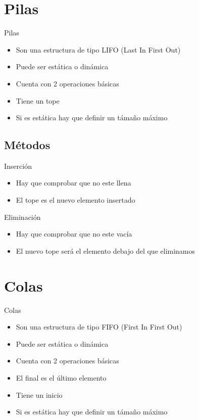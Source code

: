 \documentclass{beamer}
\begin{document}
\section{Pilas}
\begin{frame}{Pilas}
	\begin{itemize}
		\item Son una estructura de tipo LIFO (Last In First Out)
		\item Puede ser est\'atica o din\'amica
		\item Cuenta con 2 operaciones b\'asicas
		\item Tiene un tope
		\item Si es est\'atica hay que definir un t\'amaño m\'aximo
	\end{itemize}
\end{frame}

\subsection{M\'etodos}

\begin{frame}{Inserci\'on}
	\begin{itemize}
		\item Hay que comprobar que no este llena
		\item El tope es el nuevo elemento insertado
	\end{itemize}
	\centering
\end{frame}

\begin{frame}{Eliminaci\'on}
	\begin{itemize}
		\item Hay que comprobar que no este vac\'ia
		\item El nuevo tope ser\'a el elemento debajo del que eliminamos
	\end{itemize}
	\centering
\end{frame}

\section{Colas}

\begin{frame}{Colas}
	\begin{itemize}
		\item Son una estructura de tipo FIFO (First In First Out)
		\item Puede ser est\'atica o din\'amica
		\item Cuenta con 2 operaciones b\'asicas
		\item El final es el \'ultimo elemento
		\item Tiene un inicio
		\item Si es est\'atica hay que definir un t\'amaño m\'aximo
	\end{itemize}
\end{frame}
\end{document}

